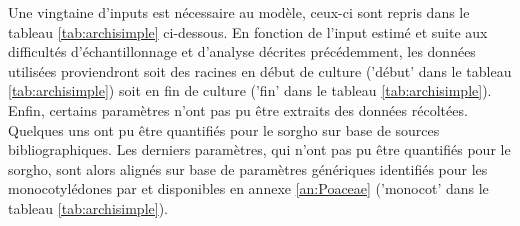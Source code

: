 Une vingtaine d'inputs est nécessaire au modèle, ceux-ci sont repris dans le tableau \ref{tab:archisimple} ci-dessous.
En fonction de l'input estimé et suite aux difficultés d'échantillonnage et d'analyse décrites précédemment, les données utilisées proviendront soit des racines en début de culture ('début' dans le tableau \ref{tab:archisimple}) soit en fin de culture ('fin' dans le tableau \ref{tab:archisimple}).
Enfin, certains paramètres n'ont pas pu être extraits des données récoltées.
Quelques uns ont pu être quantifiés pour le sorgho sur base de sources bibliographiques.
Les derniers paramètres, qui n'ont pas pu être quantifiés pour le sorgho, sont alors alignés sur base de paramètres génériques identifiés pour les monocotylédones par \cite{gerard_modelling_2017} et disponibles en annexe \ref{an:Poaceae} ('monocot' dans le tableau \ref{tab:archisimple}).

\newpage 

